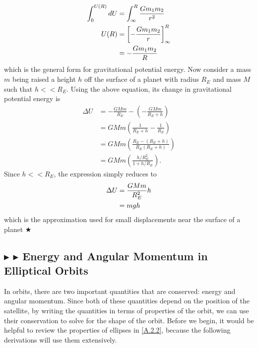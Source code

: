 \begin{align}
    \int_0^{U(R)} dU &= \int_{\infty}^R \frac{Gm_1m_2}{r^2} \nonumber \\
    U(R) &= \left[-\frac{Gm_1m_2}{r}\right]_{\infty}^{R} \nonumber \\
    &= -\frac{Gm_1m_2}{R}
\end{align}
\noindent which is the general form for gravitational potential energy. Now consider a mass $m$ being raised a height $h$ off the surface of a planet with radius $R_E$ and mass $M$ such that $h << R_E$. Using the above equation, its change in gravitational potential energy is 
\begin{align*}
    \Delta U &= -\frac{GMm}{R_E} - \left(-\frac{GMm}{R_E+h}\right) \\
    &= GMm\left(\frac{1}{R_E + h} - \frac{1}{R_E}\right) \\
    &= GMm\left(\frac{R_E - (R_E + h)}{R_E(R_E + h)}\right) \\
    &= GMm\left(\frac{h/R_E^2}{1+ h/R_E}\right).
\end{align*}
\noindent Since $h<<R_E$, the expression simply reduces to
\begin{align}
    \Delta U &= \frac{GMm}{R_E^2}h \nonumber \\
    &= mgh
\end{align}
\noindent which is the approximation used for small displacements near the surface of a planet $\bigstar$

%
%
\subsection{\color{Goldenrod} $\blacktriangleright$ \color{Orchid} $\blacktriangleright$ \color{black} Energy and Angular Momentum in Elliptical Orbits}\label{1.5.2}
In orbits, there are two important quantities that are conserved: energy and angular momentum. Since both of these quantities depend on the position of the satellite, by writing the quantities in terms of properties of the orbit, we can use their conservation to solve for the shape of the orbit. Before we begin, it would be helpful to review the properties of ellipses in \ref{A.2.2}, because the following derivations will use them extensively.

